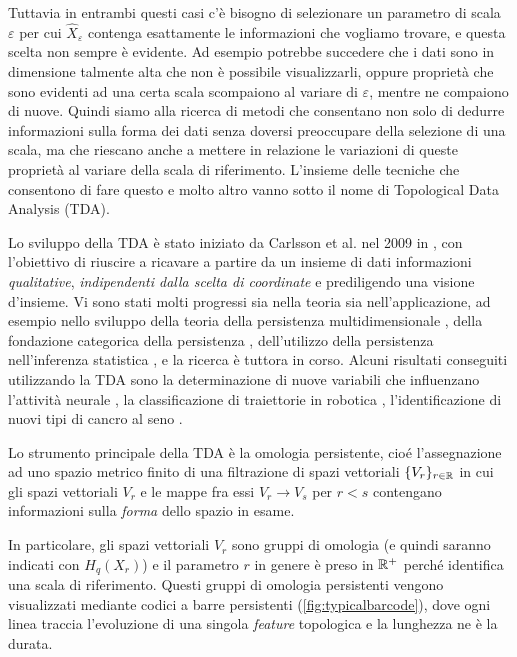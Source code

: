 Tuttavia in entrambi questi casi c'è bisogno di selezionare un parametro di scala $\varepsilon$ per cui $\widehat{X}_\varepsilon$ contenga esattamente le informazioni che vogliamo trovare, e questa scelta non sempre è evidente. Ad esempio potrebbe succedere che i dati sono in dimensione talmente alta che non è possibile visualizzarli, oppure proprietà che sono evidenti ad una certa scala scompaiono al variare di $\varepsilon$, mentre ne compaiono di nuove. Quindi siamo alla ricerca di metodi che consentano non solo di dedurre informazioni sulla forma dei dati senza doversi preoccupare della selezione di una scala, ma che riescano anche a mettere in relazione le variazioni di queste proprietà al variare della scala di riferimento. L'insieme delle tecniche che consentono di fare questo e molto altro vanno sotto il nome di Topological Data Analysis (TDA).

Lo sviluppo della TDA è stato iniziato da Carlsson et al. nel 2009 in \cite{Carlsson2009}, con l'obiettivo di riuscire a ricavare a partire da un insieme di dati informazioni \emph{qualitative}, \emph{indipendenti dalla scelta di coordinate} e prediligendo una visione d'insieme. Vi sono stati molti progressi sia nella teoria sia nell'applicazione, ad esempio nello sviluppo della teoria della persistenza multidimensionale \cite{Cerri2013,Carlsson2009a,Adcock2012,Carlsson2009b}, della fondazione categorica della persistenza
\cite{Curry}, dell'utilizzo della persistenza nell'inferenza statistica \cite{Bubenik2015,Kwitt2015}, e la ricerca è tuttora in corso.
Alcuni risultati conseguiti utilizzando la TDA sono la determinazione di nuove variabili che influenzano l'attività neurale \cite{Spreemann2015}, la classificazione di traiettorie in robotica \cite{Pokorny2014}, l'identificazione di nuovi tipi di cancro al seno \cite{Lum2013}.

Lo strumento principale della TDA è la omologia persistente, cioé l'assegnazione ad uno spazio metrico finito di una filtrazione di spazi vettoriali $\{V_r\}_{r\in\mathbb{R}}$ in cui gli spazi vettoriali $V_r$ e le mappe fra essi $V_r\to V_s$ per $r<s$ contengano informazioni sulla \emph{forma} dello spazio in esame.

In particolare, gli spazi vettoriali $V_r$ sono gruppi di omologia (e quindi saranno indicati con $H_q(X_r)$) e il parametro $r$ in genere è preso in $\mathbb{R}^+$ perché identifica una scala di riferimento. Questi gruppi di omologia persistenti vengono visualizzati mediante codici a barre persistenti (\cref{fig:typicalbarcode}), dove ogni linea traccia l'evoluzione di una singola \emph{feature} topologica e la lunghezza ne è la durata.

